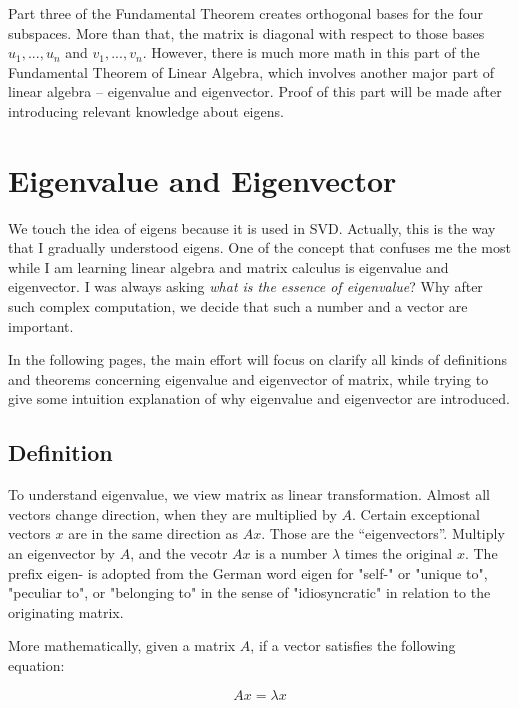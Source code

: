 \documentclass[a4paper]{book}
\begin{document}
    Part three of the Fundamental Theorem creates orthogonal bases for
    the four subspaces. More than that, the matrix is diagonal with
    respect to those bases $u_{1}, ... , u_{n}$ and $v_{1}, ... ,
    v_{n}$. However, there is much more math in this part of the
    Fundamental Theorem of Linear Algebra, which involves another major
    part of linear algebra -- eigenvalue and eigenvector. Proof of this
    part will be made after introducing relevant knowledge about eigens.

  \section{Eigenvalue and Eigenvector}

  We touch the idea of eigens because it is used in SVD. Actually, this
  is the way that I gradually understood eigens. One of the concept that
  confuses me the most while I am learning linear algebra and matrix
  calculus is eigenvalue and eigenvector. I was always asking
  \textit{what is the essence of eigenvalue}? Why after such complex
  computation, we decide that such a number and a vector are important.

  In the following pages, the main effort will focus on clarify all kinds
  of definitions and theorems concerning eigenvalue and eigenvector of
  matrix, while trying to give some intuition explanation of why
  eigenvalue and eigenvector are introduced.

    \subsection{Definition}

    To understand eigenvalue, we view matrix as linear transformation.
    Almost all vectors change direction, when they are multiplied by
    $A$.  Certain exceptional vectors $x$ are in the same direction as
    $Ax$. Those are the ``eigenvectors''. Multiply an eigenvector by
    $A$, and the vecotr $Ax$ is a number $\lambda$ times the original
    $x$\cite{strang2009introduction}. The prefix eigen- is adopted from
    the German word eigen for "self-" or "unique to", "peculiar to", or
    "belonging to" in the sense of "idiosyncratic" in relation to the
    originating matrix\cite{wiki_eigens}.

    More mathematically, given a matrix $A$, if a vector satisfies the
    following equation:

    \begin{equation*}
      Ax = \lambda x
    \end{equation*}
\end{document}
